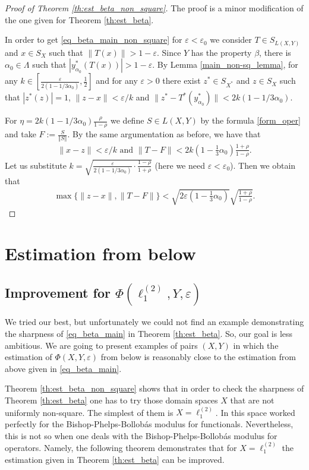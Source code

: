 \documentclass[11pt,a4paper]{amsart}
\newcommand{\eps}{\varepsilon}
\newcommand{\norm}[1]{\left\Vert#1\right\Vert}
\numberwithin{equation}{section}
\theoremstyle{plain}
\theoremstyle{definition}
\begin{document}
\begin{proof}[Proof of Theorem \ref{th:est_beta_non_square}]
The proof is a minor modification of the one given for Theorem \ref{th:est_beta}. 

In order to get \eqref{eq_beta_main_non_square} for $\eps<\eps_0$ we
consider $T\in S_{L(X,Y)}$ and $x\in S_X$ such that $\|T(x)\|> 1-\eps$. 
Since $Y$ has the property $\beta$, there is $\alpha_0\in \Lambda$ such that $|y^*_{\alpha_0}(T(x))|> 1-\eps$. By Lemma \ref{main_non-sq_lemma}, for
any  $k \in [\frac{\eps}{2(1-1/3\alpha_0)}, \frac12]$ and for any $\eps>0$ there exist $z^*\in S_{X^*}$ and $z\in S_X$ such that $|z^*(z)|=1$, $\|z-x\|< \eps/k$ and $\|z^*-T^*(y^*_{\alpha_0})\|< 2k(1- 1/3\alpha_0)$.

For $\eta = 2k(1- 1/3\alpha_0)\frac{\rho}{1-\rho}$ we define $S\in L(X,Y)$ by the formula \eqref{form_oper} and take $F:=\frac{S}{\norm{S}}$.
By the same argumentation as before, we have that
\begin{align*}
\|x-z\|< \eps/k 	\mbox{ and } \|T-F\|< 2k\left(1- \frac{1}{3}\alpha_0\right) \frac{1+\rho}{1-\rho}.
\end{align*}
Let us substitute $k=\sqrt{\frac{\varepsilon}{2(1- 1/3\alpha_0)}\cdot \frac{1-\rho}{1+\rho}}$ (here we need $\eps<\eps_0$). Then we obtain that 
\begin{align*}
\max\{\|z-x\|, \|T-F\|\}< \sqrt{2\varepsilon\left(1- \frac{1}{3}\alpha_0\right)}\sqrt{\frac{1+\rho}{1-\rho}}.
\end{align*}
\end{proof}


\section{Estimation from below}\label{sec3}
\subsection{Improvement for $\Phi(\ell^{(2)}_1,Y,\varepsilon)$}
We tried our best, but unfortunately we could not find an example demonstrating the sharpness of \eqref{eq_beta_main} in Theorem \ref{th:est_beta}. So, our goal is less ambitious. We are going to present examples of pairs $(X, Y)$  in which the estimation of $\Phi(X,Y, \varepsilon)$ from below is reasonably close to the estimation from above given in \eqref{eq_beta_main}.

Theorem \ref{th:est_beta_non_square} shows that in order to check the sharpness of Theorem \ref{th:est_beta} one has to  try those domain spaces $X$ that are not uniformly non-square. The simplest of them is  $X=\ell^{(2)}_1$. In \cite[Example 2.5]{Modul2014} this space worked perfectly for the Bishop-Phelps-Bollob\'{a}s modulus for functionals. Nevertheless, this is not so when one deals with the Bishop-Phelps-Bollob\'{a}s modulus for operators. Namely, the following theorem demonstrates that for $X=\ell^{(2)}_1$ the estimation given in Theorem \ref{th:est_beta} can be improved.
\end{document}
